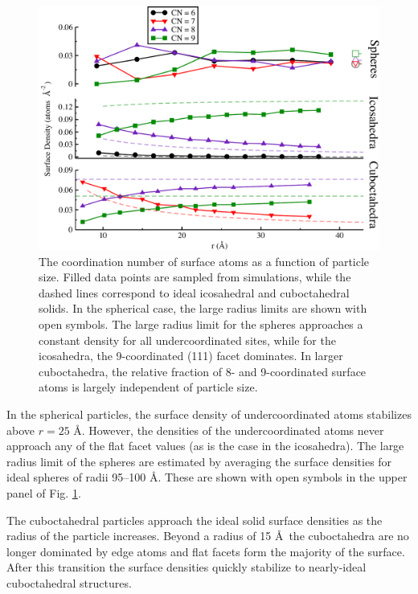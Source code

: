 \begin{figure}
	\includegraphics[width=\linewidth]{figures/new-cn.pdf}
	\caption{The coordination number of surface atoms as a
          function of particle size. Filled data points are sampled
          from simulations, while the dashed lines correspond to ideal
          icosahedral and cuboctahedral solids. In the spherical case,
          the large radius limits are shown with open symbols.  The
          large radius limit for the spheres approaches a constant
          density for all undercoordinated sites, while for the
          icosahedra, the 9-coordinated (111) facet dominates. In
          larger cuboctahedra, the relative fraction of 8- and
          9-coordinated surface atoms is largely independent of
          particle size.} 
	\label{fig:stacked-cn}
\end{figure}

In the spherical particles, the surface density of undercoordinated
atoms stabilizes above $r = 25$ \AA.  However, the densities of the
undercoordinated atoms never approach any of the flat facet values (as
is the case in the icosahedra).  The large radius
limit of the spheres are estimated by averaging the surface densities for ideal
spheres of radii 95--100 \AA.  These are shown with open symbols in
the upper panel of Fig. \ref{fig:stacked-cn}.

The cuboctahedral particles approach the ideal solid surface densities
as the radius of the particle increases. Beyond a radius of 15 \AA\,
the cuboctahedra are no longer dominated by edge atoms and flat facets
form the majority of the surface. After this transition the surface
densities quickly stabilize to nearly-ideal cuboctahedral structures.

